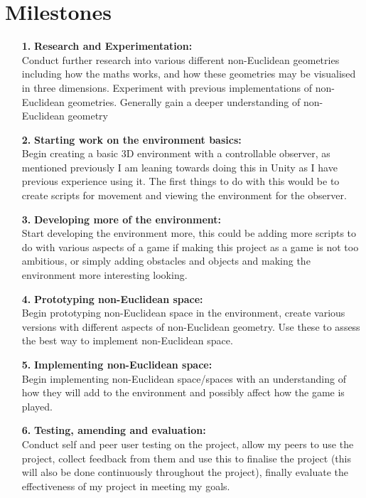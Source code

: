 \documentclass[]{article}
\begin{document}
     \section{Milestones}
         \begin{itemize}
            \item [\textbf{1.}] \textbf{Research and Experimentation:} \\ 
                Conduct further research into various different non-Euclidean geometries including how the maths works, and how 
                these geometries may be visualised in three dimensions. Experiment with previous implementations of non-Euclidean geometries. 
                Generally gain a deeper understanding of non-Euclidean geometry
             \item [\textbf{2.}] \textbf{Starting work on the environment basics:} \\ 
                Begin creating a basic 3D environment with a controllable observer, 
                as mentioned previously I am leaning towards doing this in Unity as I have previous experience using it. 
                The first things to do with this would be to create scripts for movement and viewing the environment for the observer.
             \item [\textbf{3.}] \textbf{Developing more of the environment:} \\
                Start developing the environment more, 
                this could be adding more scripts to do with various aspects of a game if 
                making this project as a game is not too ambitious, or simply adding obstacles and objects and making the environment 
                more interesting looking.
             \item [\textbf{4.}] \textbf{Prototyping non-Euclidean space:} \\
                Begin prototyping non-Euclidean space in the environment, create various versions with different aspects of non-Euclidean geometry.
                Use these to assess the best way to implement non-Euclidean space. 
             \item [\textbf{5.}] \textbf{Implementing non-Euclidean space:} \\
                Begin implementing non-Euclidean space/spaces with an understanding of how they will add to the environment and possibly 
                affect how the game is played.
             \item [\textbf{6.}] \textbf{Testing, amending and evaluation:} \\
                Conduct self and peer user testing on the project, allow my peers to use the project, collect feedback from them and use
                this to finalise the project  (this will also be done continuously throughout the project), 
                finally evaluate the effectiveness of my project in meeting my goals.
         \end{itemize}
\end{document}
